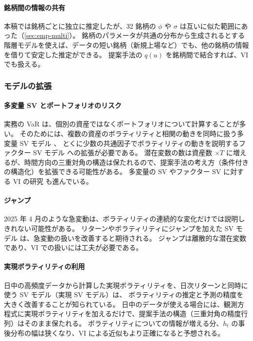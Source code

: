 \paragraph{銘柄間の情報の共有}
本稿では銘柄ごとに独立に推定したが、32 銘柄の $\phi$ や $\sigma$ は互いに似た範囲にあった（\cref{sec:emp-multi}）。
銘柄のパラメータが共通の分布から生成されるとする階層モデルを使えば、データの短い銘柄（新規上場など）でも、他の銘柄の情報を借りて安定した推定ができる。
提案手法の $q(u)$ を銘柄間で結合すれば、VI でも扱える。

\subsubsection{モデルの拡張}

\paragraph{多変量 SV とポートフォリオのリスク}
実務の VaR は、個別の資産ではなくポートフォリオについて計算することが多い。
そのためには、複数の資産のボラティリティと相関の動きを同時に扱う多変量 SV モデル \parencite{asai2006}、
とくに少数の共通因子でボラティリティの動きを説明するファクター SV モデル \parencite{chib2006}への拡張が必要である。
潜在変数の数は資産数 $\times T$ に増えるが、時間方向の三重対角の構造は保たれるので、提案手法の考え方（条件付きの構造化）を拡張できる可能性がある。
多変量の SV やファクター SV に対する VI の研究 \parencite{gunawan2021,chan2022,quiroz2023}も進んでいる。

\paragraph{ジャンプ}
2025 年 4 月のような急変動は、ボラティリティの連続的な変化だけでは説明しきれない可能性がある。
リターンやボラティリティにジャンプを加えた SV モデル \parencite{eraker2003}は、急変動の扱いを改善すると期待される。
ジャンプは離散的な潜在変数であり、VI での扱いには工夫が必要である。

\paragraph{実現ボラティリティの利用}
日中の高頻度データから計算した実現ボラティリティを、日次リターンと同時に使う SV モデル（実現 SV モデル）\parencite{takahashi2009}は、
ボラティリティの推定と予測の精度を大きく改善することが知られている。
日中のデータが使える場合には、観測方程式に実現ボラティリティを加えるだけで、提案手法の構造（三重対角の精度行列）はそのまま保たれる。
ボラティリティについての情報が増える分、$h_t$ の事後分布の幅は狭くなり、VI による近似もより正確になると予想される。


